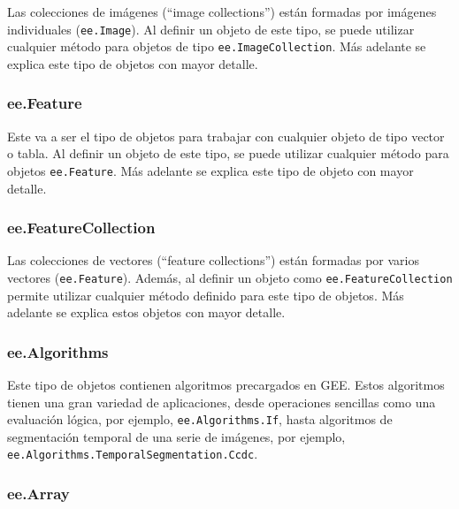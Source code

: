 \documentclass[
  12pt,
  letterpaper,
  twoside]{book}
\begin{document}
Las colecciones de imágenes (``image collections'') están formadas por imágenes individuales (\texttt{ee.Image}). Al definir un objeto de este tipo, se puede utilizar cualquier método para objetos de tipo \texttt{ee.ImageCollection}. Más adelante se explica este tipo de objetos con mayor detalle.

\hypertarget{ee.feature}{%
\subsubsection*{ee.Feature}\label{ee.feature}}

Este va a ser el tipo de objetos para trabajar con cualquier objeto de tipo vector o tabla. Al definir un objeto de este tipo, se puede utilizar cualquier método para objetos \texttt{ee.Feature}. Más adelante se explica este tipo de objeto con mayor detalle.

\hypertarget{ee.featurecollection}{%
\subsubsection*{ee.FeatureCollection}\label{ee.featurecollection}}

Las colecciones de vectores (``feature collections'') están formadas por varios vectores (\texttt{ee.Feature}). Además, al definir un objeto como \texttt{ee.FeatureCollection} permite utilizar cualquier método definido para este tipo de objetos. Más adelante se explica estos objetos con mayor detalle.

\hypertarget{ee.algorithms}{%
\subsubsection*{ee.Algorithms}\label{ee.algorithms}}

Este tipo de objetos contienen algoritmos precargados en GEE. Estos algoritmos tienen una gran variedad de aplicaciones, desde operaciones sencillas como una evaluación lógica, por ejemplo, \texttt{ee.Algorithms.If}, hasta algoritmos de segmentación temporal de una serie de imágenes, por ejemplo, \texttt{ee.Algorithms.TemporalSegmentation.Ccdc}.

\hypertarget{ee.array}{%
\subsubsection*{ee.Array}\label{ee.array}}
\end{document}
